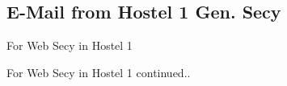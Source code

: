 \documentclass{article}
\begin{document}
	\subsection{E-Mail from Hostel 1 Gen. Secy}
		For Web Secy in Hostel 1
		\begin{figure}[h]
		\end{figure}
\newpage
		\noindent For Web Secy in Hostel 1 continued..
\end{document}
